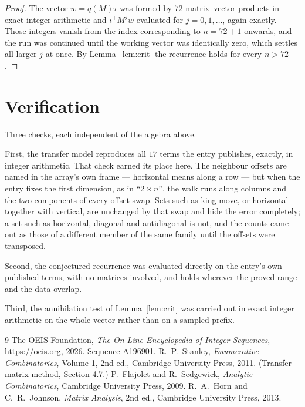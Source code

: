 \documentclass[11pt,a4paper]{article}
\theoremstyle{plain}
\theoremstyle{definition}
\begin{document}
\begin{proof}
The vector $w=q(M)\tau$ was formed by $72$ matrix--vector products in exact integer
arithmetic and $\iota^{\!\top}M^{j}w$ evaluated for $j=0,1,\dots$, again exactly. Those
integers vanish from the index corresponding to $n=72+1$ onwards, and the run was
continued until the working vector was identically zero, which settles all larger $j$ at once.
By Lemma~\ref{lem:crit} the recurrence holds for every $n>72$.
\end{proof}

\section{Verification}

Three checks, each independent of the algebra above.

First, the transfer model reproduces all $17$ terms the entry publishes, exactly, in
integer arithmetic. That check earned its place here. The neighbour offsets are named in the
array's own frame --- horizontal means along a row --- but when the entry fixes the first
dimension, as in ``$2\times n$'', the walk runs along columns and the two components of every
offset swap. Sets such as king-move, or horizontal together with vertical, are unchanged by
that swap and hide the error completely; a set such as horizontal, diagonal and antidiagonal
is not, and the counts came out as those of a different member of the same family until the
offsets were transposed.

Second, the conjectured recurrence was evaluated directly on the entry's own published terms,
with no matrices involved, and holds wherever the proved range and the data overlap.

Third, the annihilation test of Lemma~\ref{lem:crit} was carried out in exact integer
arithmetic on the whole vector rather than on a sampled prefix.

\begin{thebibliography}{9}
 The OEIS Foundation, \emph{The On-Line Encyclopedia of Integer
Sequences}, \url{https://oeis.org}, 2026. Sequence A196901.
 R.~P.~Stanley, \emph{Enumerative Combinatorics}, Volume 1, 2nd ed.,
Cambridge University Press, 2011. (Transfer-matrix method, Section 4.7.)
 P.~Flajolet and R.~Sedgewick, \emph{Analytic Combinatorics}, Cambridge
University Press, 2009.
 R.~A.~Horn and C.~R.~Johnson, \emph{Matrix Analysis}, 2nd ed., Cambridge
University Press, 2013.
\end{thebibliography}
\end{document}
